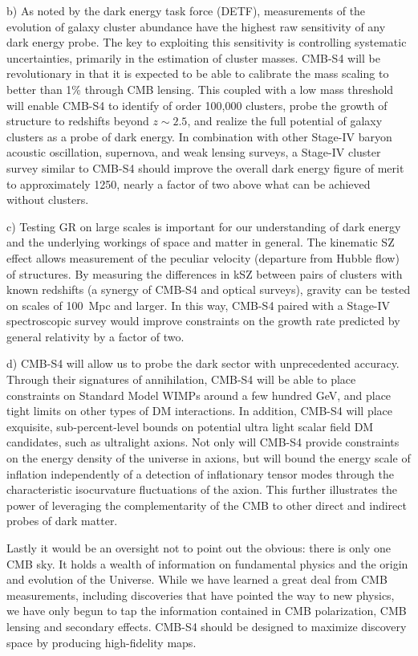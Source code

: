 \begin{enumerate}
{ b) As noted by the dark energy task force (DETF), measurements of the evolution of galaxy cluster abundance have the highest raw sensitivity of any dark energy probe. The key to exploiting this sensitivity is controlling systematic uncertainties, primarily in the estimation of cluster masses. CMB-S4 will be revolutionary in that it is expected to be able to calibrate the mass scaling to better than 1\% through CMB lensing. This coupled with a low mass threshold will enable CMB-S4 to identify of order 100,000 clusters, probe the growth of structure to redshifts beyond $z \sim 2.5$, and realize the full potential of galaxy clusters as a probe of dark energy.  In combination with other Stage-IV baryon acoustic oscillation, supernova, and weak lensing surveys, a Stage-IV cluster survey similar to CMB-S4 should improve the overall dark energy figure of merit to approximately 1250, nearly a factor of two above what can be achieved without clusters. 

 c) Testing GR on large scales is important for our understanding of dark energy and the underlying workings of space and matter in general.  The kinematic SZ effect allows measurement of the peculiar velocity (departure from Hubble flow) of structures. By measuring the differences in kSZ between pairs of clusters with known redshifts (a synergy of CMB-S4 and optical surveys), gravity can be tested on scales of 100~Mpc and larger. In this way, CMB-S4 paired with a Stage-IV spectroscopic survey would improve constraints on the growth rate predicted by general relativity by a factor of two.
 
 d) CMB-S4 will allow us to probe the dark sector with unprecedented accuracy.  Through their signatures of annihilation, CMB-S4 will be able to place constraints on Standard Model WIMPs around a few hundred GeV, and place tight limits on other types of DM interactions. In addition, CMB-S4 will place exquisite, sub-percent-level bounds on potential ultra light scalar field DM candidates, such as ultralight axions. Not only will CMB-S4 provide constraints on the energy density of the universe in axions, but will bound the energy scale of inflation independently of a detection of inflationary tensor modes through the characteristic isocurvature fluctuations of the axion. This further illustrates the power of leveraging the complementarity of the CMB to other direct and indirect probes of dark matter.
 }

\end{enumerate}

Lastly it would be an oversight not to point out the obvious: there is only one CMB sky. It holds a wealth of information on fundamental physics and the origin and evolution of the Universe. While we have learned a great deal from CMB measurements, including discoveries that have pointed the way to new physics, we have only begun to tap the information contained in CMB polarization, CMB lensing and secondary effects. CMB-S4 should be designed to maximize discovery space by producing high-fidelity maps. 

